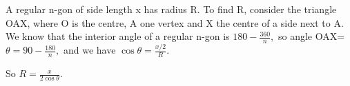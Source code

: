 A regular n-gon of side length x has radius R. To find R,
consider the triangle OAX, where O is the centre, A one vertex 
and X the centre of a side next to A. We know that the interior
angle of a regular n-gon is $ 180 - \frac{360}{n}, $ so
angle OAX= $ \theta = 90 - \frac{180}{n} , $
and we have $ \cos \theta = \frac{x/2}{R} . $
\par
So $ R = \frac{x}{2 \cos \theta } . $